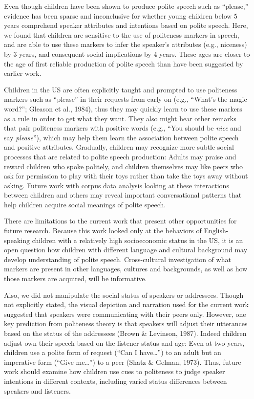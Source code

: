 \documentclass[10pt, letterpaper]{article}
\begin{document}
Even though children have been shown to produce polite speech such as
``please,'' evidence has been sparse and inconclusive for whether young
children below 5 years comprehend speaker attributes and intentions
based on polite speech. Here, we found that children are sensitive to
the use of politeness markers in speech, and are able to use these
markers to infer the speaker's attributes (e.g., niceness) by 3 years,
and consequent social implications by 4 years. These ages are closer to
the age of first reliable production of polite speech than have been
suggested by earlier work.

Children in the US are often explicitly taught and prompted to use
politeness markers such as ``please'' in their requests from early on
(e.g., ``What's the magic word?''; Gleason et al., 1984), thus they may
quickly learn to use these markers as a rule in order to get what they
want. They also might hear other remarks that pair politeness markers
with positive words (e.g., ``You should be \emph{nice} and say
\emph{please}''), which may help them learn the association between
polite speech and positive attributes. Gradually, children may recognize
more subtle social processes that are related to polite speech
production: Adults may praise and reward children who spoke politely,
and children themselves may like peers who ask for permission to play
with their toys rather than take the toys away without asking. Future
work with corpus data analysis looking at these interactions between
children and others may reveal important conversational patterns that
help children acquire social meanings of polite speech.

There are limitations to the current work that present other
opportunities for future research. Because this work looked only at the
behaviors of English-speaking children with a relatively high
socioeconomic status in the US, it is an open question how children with
different language and cultural background may develop understanding of
polite speech. Cross-cultural investigation of what markers are present
in other languages, cultures and backgrounds, as well as how those
markers are acquired, will be informative.

Also, we did not manipulate the social status of speakers or addressees.
Though not explicitly stated, the visual depiction and narration used
for the current work suggested that speakers were communicating with
their peers only. However, one key prediction from politeness theory is
that speakers will adjust their utterances based on the status of the
addressees (Brown \& Levinson, 1987). Indeed children adjust own their
speech based on the listener status and age: Even at two years, children
use a polite form of request (``Can I have\ldots{}'') to an adult but an
imperative form (``Give me\ldots{}'') to a peer (Shatz \& Gelman, 1973).
Thus, future work should examine how children use cues to politeness to
judge speaker intentions in different contexts, including varied status
differences between speakers and listeners.
\end{document}
